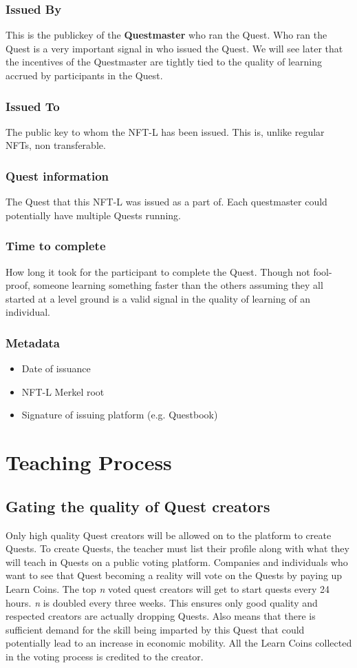 \documentclass{article}
\begin{document}
      \subsubsection{Issued By}
        This is the publickey of the \textbf{Questmaster} who ran the Quest. Who ran the Quest is a very important signal in who issued the Quest. We will see later that the incentives of the Questmaster are tightly tied to the quality of learning accrued by participants in the Quest. 
      \subsubsection{Issued To}
        The public key to whom the NFT-L has been issued. This is, unlike regular NFTs, non transferable. 
      \subsubsection{Quest information}
        The Quest that this NFT-L was issued as a part of. Each questmaster could potentially have multiple Quests running. 
      \subsubsection{Time to complete}
        How long it took for the participant to complete the Quest. Though not fool-proof, someone learning something faster than the others assuming they all started at a level ground is a valid signal in the quality of learning of an individual. 
      \subsubsection{Metadata}
        \begin{itemize}
          \item Date of issuance
          \item NFT-L Merkel root
          \item Signature of issuing platform (e.g. Questbook)
        \end{itemize}
  \section{Teaching Process}
    \subsection{Gating the quality of Quest creators}
      Only high quality Quest creators will be allowed on to the platform to create Quests. To create Quests, the teacher must list their profile along with what they will teach in Quests on a public voting platform.
      Companies and individuals who want to see that Quest becoming a reality will vote on the Quests by paying up Learn Coins. The top \textit{n} voted quest creators will get to start quests every 24 hours. 
      \break
      \textit{n} is doubled every three weeks.
      \break
      This ensures only good quality and respected creators are actually dropping Quests. Also means that there is sufficient demand for the skill being imparted by this Quest that could potentially lead to an increase in economic mobility.
      All the Learn Coins collected in the voting process is credited to the creator.
\end{document}
